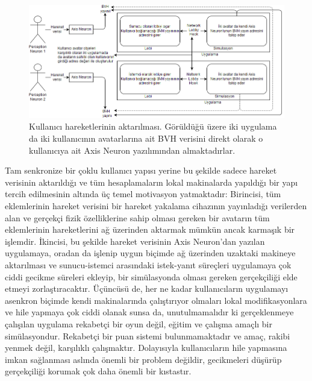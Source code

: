 \documentclass[a4paper, 12pt, titlepage]{article}
\begin{document}
\begin{figure}[ht!]
    \centering
        \includegraphics[width=6in]{images/net}
    \caption{Kullanıcı hareketlerinin aktarılması. Görüldüğü üzere iki uygulama da iki kullanıcının
             avatarlarına ait BVH verisini direkt olarak o kullanıcıya ait Axis Neuron yazılımından
             almaktadırlar.}
    \label{net}
\end{figure}

Tam senkronize bir çoklu kullanıcı yapısı yerine bu şekilde sadece hareket verisinin aktarıldığı ve
tüm hesaplamaların lokal makinalarda yapıldığı bir yapı tercih edilmesinin altında üç temel
motivasyon yatmaktadır: Birincisi, tüm eklemlerinin hareket verisini bir hareket yakalama cihazının
yayınladığı verilerden alan ve gerçekçi fizik özelliklerine sahip olması gereken bir avatarın tüm
eklemlerinin hareketlerini ağ üzerinden aktarmak mümkün ancak karmaşık bir işlemdir. İkincisi, bu
şekilde hareket verisinin Axis Neuron’dan yazılan uygulamaya, oradan da işlenip uygun biçimde ağ
üzerinden uzaktaki makineye aktarılması ve sunucu-istemci arasındaki istek-yanıt süreçleri
uygulamaya çok ciddi gecikme süreleri ekleyip, bir simülasyonda olması gereken gerçekçiliği elde
etmeyi zorlaştıracaktır. Üçüncüsü de, her ne kadar kullanıcıların uygulamayı asenkron biçimde kendi
makinalarında çalıştırıyor olmaları lokal modifikasyonlara ve hile yapmaya çok ciddi olanak sunsa
da, unutulmamalıdır ki gerçeklenmeye çalışılan uygulama rekabetçi bir oyun değil, eğitim ve çalışma
amaçlı bir simülasyondur. Rekabetçi bir puan sistemi bulunmamaktadır ve amaç, rakibi yenmek değil,
karşılıklı çalışmaktır. Dolayısıyla kullanıcıların hile yapmasına imkan sağlanması aslında önemli
bir problem değildir, gecikmeleri düşürüp gerçekçiliği korumak çok daha önemli bir kıstastır.
\end{document}
